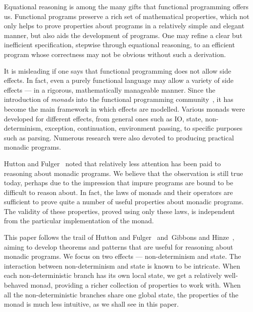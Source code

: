 \documentclass{llncs}
\begin{document}
Equational reasoning is among the many gifts that functional programming offers us. Functional programs preserve a rich set of mathematical properties, which not only helps to prove properties about programs in a relatively simple and elegant manner, but also aids the development of programs. One may refine a clear but inefficient specification, stepwise through equational reasoning, to an efficient program whose correctness may not be obvious without such a derivation.

It is misleading if one says that functional programming does not allow side effects. In fact, even a purely functional language may allow a variety of side effects --- in a rigorous, mathematically manageable manner. Since the introduction of {\em monads} into the functional programming community~\cite{Moggi:89:Computational, Wadler:92:Monads}, it has become the main framework in which effects are modelled. Various monads were developed for different effects, from general ones such as IO, state, non-determinism, exception, continuation, environment passing, to specific purposes such as parsing. Numerous research were also devoted to producing practical monadic programs.


Hutton and Fulger~\cite{HuttonFulger:08:Reasoning} noted that relatively less attention has been paid to reasoning about monadic programs.
We believe that the observation is still true today, perhaps due to the impression that impure programs are bound to be difficult to reason about.
In fact, the laws of monads and their operators are sufficient to prove quite a number of useful properties about monadic programs.
The validity of these properties, proved using only these laws, is independent from the particular implementation of the monad.

This paper follows the trail of Hutton and Fulger~\cite{HuttonFulger:08:Reasoning} and~Gibbons and Hinze~\cite{GibbonsHinze:11:Just}, aiming to develop theorems and patterns that are useful for reasoning about monadic programs.
We focus on two effects --- non-determinism and state.
The interaction between non-determinism and state is known to be intricate.
When each non-deterministic branch has its own local state, we get a relatively well-behaved monad, providing a richer collection of properties to work with.
When all the non-deterministic branches share one global state, the properties of the monad is much less intuitive, as we shall see in this paper.
\end{document}
